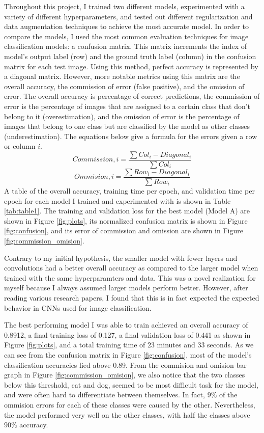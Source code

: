 \documentclass[11pt,a4paper]{article}
\begin{document}
Throughout this project, I trained two different models, experimented with a variety of different hyperparameters,
 and tested out different regularization and data augmentation techniques to achieve the most accurate model. In order 
 to compare the models, I used the most common evaluation techniques for image classification models: a confusion matrix. 
 This matrix increments the index of model's output label (row) and the ground truth label (column) in the confusion matrix for each test image. Using this
 method, perfect accuracy is represented by a diagonal matrix. However, more notable metrics using this matrix are the 
 overall accuracy, the commission of error (false positive), and the omission of error. The overall accuracy is percentage of correct 
 predictions, the commission of error is the percentage of images that are assigned to a certain class that don't belong 
 to it (overestimation), and the omission of error is the percentage of images that belong to one class but are classified by the model 
 as other classes (underestimation). The equations below give a formula for the errors given a row or column $i$. $$Commission, i = \frac{\sum Col_i - Diagonal_i}{\sum Col_i}$$ 
 $$Ommision, i = \frac{\sum Row_i - Diagonal_i}{\sum Row_i}$$ A table of the overall accuracy, training time per epoch, and validation time per epoch 
 for each model I trained and experimented with is shown in Table \ref{tab:table1}. The training and validation loss for the best model (Model A)
 are shown in Figure \ref{fig:plots}, its normalized confusion matrix is shown in Figure \ref{fig:confusion}, and its error of commission
  and omission are shown in Figure \ref{fig:commission_omision}.

Contrary to my initial hypothesis, the smaller model with fewer layers and convolutions had a better overall accuracy as compared to the larger model 
 when trained with the same hyperparamters and data. This was a novel realization for myself because I always assumed larger models perform better. However, after reading 
 various research papers, I found that this is in fact expected the expected behavior in CNNs used for image classification. 

The best performing model I was able to train achieved an overall accuracy of 0.8912, a final training loss of 0.127, a final validation loss of 0.441 as shown in Figure \ref{fig:plots}, and a total training time of 23 minutes and 33 seconds.
  As we can see from the confusion matrix in Figure \ref{fig:confusion}, most of the model's classification accuracies lied above 0.89. From the commision and omision bar graph
   in Figure \ref{fig:commission_omision}, we also notice that the two classes below this threshold, cat and dog, seemed to be most difficult task for the model, and were often hard to differentiate between themselves.
   In fact, $9\%$ of the ommision errors for each of these classes were caused by the other. Nevertheless, the model performed very well on the other classes, with half the classes
   above $90\%$ accuracy.
\end{document}
